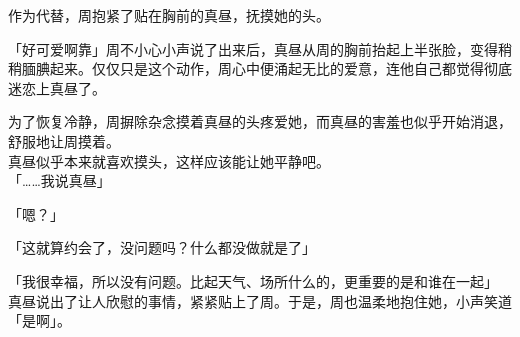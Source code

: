 作为代替，周抱紧了贴在胸前的真昼，抚摸她的头。

「好可爱啊靠」周不小心小声说了出来后，真昼从周的胸前抬起上半张脸，变得稍稍腼腆起来。仅仅只是这个动作，周心中便涌起无比的爱意，连他自己都觉得彻底迷恋上真昼了。

为了恢复冷静，周摒除杂念摸着真昼的头疼爱她，而真昼的害羞也似乎开始消退，舒服地让周摸着。\\

真昼似乎本来就喜欢摸头，这样应该能让她平静吧。\\

「……我说真昼」

「嗯？」

「这就算约会了，没问题吗？什么都没做就是了」

「我很幸福，所以没有问题。比起天气、场所什么的，更重要的是和谁在一起」\\

真昼说出了让人欣慰的事情，紧紧贴上了周。于是，周也温柔地抱住她，小声笑道「是啊」。
